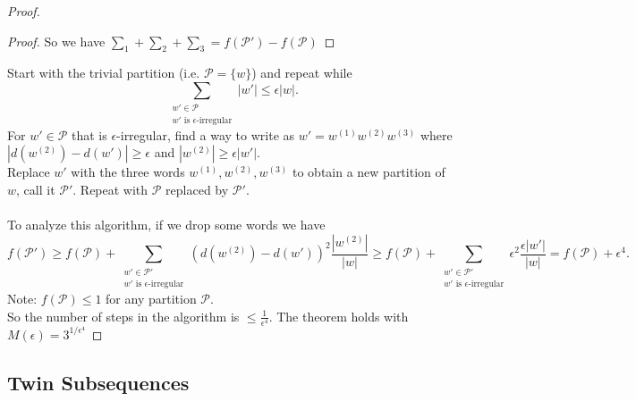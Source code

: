\documentclass[a4paper]{article}
\begin{document}
\begin{proof}
\begin{proof}
        So we have $\sum_1+\sum_2+\sum_3=f(\mathcal{P}')-f(\mathcal{P})$
    \end{proof}
    \noindent Start with the trivial partition (i.e. $\mathcal{P}= \{w\}$) and repeat while \[
        \sum_{\substack{w'\in \mathcal{P} \\ w' \text{ is } \epsilon\text{-irregular}}} |w'|\leq \epsilon |w|
    .\]
    For $w'\in \mathcal{P}$ that is $\epsilon$-irregular, find a way to write as $w'=w^{(1)}w^{(2)}w^{(3)}$ where $|d(w^{(2)})-d(w')|\geq \epsilon$ and $|w^{(2)}|\geq \epsilon |w'|$.\\
    Replace $w'$ with the three words $w^{(1)},w^{(2)},w^{(3)}$ to obtain a new partition of $w$, call it $\mathcal{P}'$. Repeat with $\mathcal{P}$ replaced by $\mathcal{P}'$.\\\\
    To analyze this algorithm, if we drop some words we have \[
    f(\mathcal{P}')\geq f(\mathcal{P})+\sum_{\substack{w'\in \mathcal{P}' \\ w' \text{ is } \epsilon\text{-irregular}}}(d(w^{(2)})-d(w'))^2\frac{|w^{(2)}|}{|w|}\geq f(\mathcal{P})+\sum_{\substack{w'\in \mathcal{P}' \\ w' \text{ is } \epsilon\text{-irregular}}}\epsilon^2 \frac{\epsilon |w'|}{|w|}=f(\mathcal{P})+\epsilon^4
    .\] 
    Note: $f(\mathcal{P})\leq 1$ for any partition $\mathcal{P}$.\\
    So the number of steps in the algorithm is $\leq \frac{1}{\epsilon^4}$. The theorem holds with $M(\epsilon)=3^{1/\epsilon^4}$
\end{proof}

\subsection{Twin Subsequences}
\end{document}
